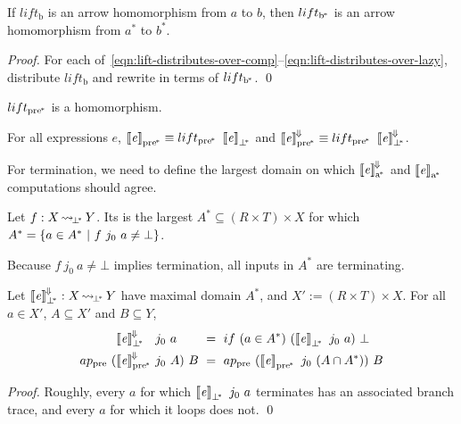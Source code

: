 \documentclass{llncs}
\newcommand{\arrow}{\rightsquigarrow}
\newcommand{\conv}{^{\mspace{-2mu}\Downarrow\mspace{-2mu}}}
\newcommand{\meaningofconv}[1]{\left\llbracket{#1}\right\rrbracket\conv}
\newcommand{\arrowlift}{\ensuremath{lift}}
\newcommand{\genb}{_\mathrm{b}}
\newcommand{\genc}{_\mathrm{a^{\mspace{-2mu}*}}}
\newcommand{\gend}{_\mathrm{b^{\mspace{-2mu}*}}}
\newcommand{\pre}{_\mathrm{pre}}
\newcommand{\pbot}{{\bot^{\mspace{-4mu}*}}}
\DeclareMathOperator{\pbotto}{\arrow_{\mspace{-3mu}\pbot}}
\newcommand{\ppre}{_\mathrm{pre^{\mspace{-2mu}*}}}
\newcommand{\liftppre}{\arrowlift\ppre}
\begin{document}
\begin{theorem}
If $\arrowlift\genb$ is an arrow homomorphism from $a$ to $b$, then $\arrowlift\gend$ is an arrow homomorphism from $a^*$ to $b^*$.
\end{theorem}
\begin{proof}
For each of~\eqref{eqn:lift-distributes-over-comp}--\eqref{eqn:lift-distributes-over-lazy}, distribute $\arrowlift\genb$ and rewrite in terms of $\arrowlift\gend$.
\qed
\end{proof}

\begin{corollary}
$\liftppre$ is a homomorphism.
\end{corollary}

\begin{corollary}
For all expressions $\mathit{e}$, $\meaningof{\mathit{e}}\ppre \equiv \liftppre~\meaningof{\mathit{e}}_\pbot$ and $\meaningofconv{\mathit{e}}\ppre \equiv \liftppre~\meaningofconv{\mathit{e}}_\pbot$.
\end{corollary}

For termination, we need to define the largest domain on which $\meaningofconv{\mathit{e}}\genc$ and $\meaningof{\mathit{e}}\genc$ computations should agree.

\begin{definition}
\label{def:maximal-domain}
Let $f : X \pbotto Y$.
Its  is the largest $A^* \subseteq (R \times T) \times X$ for which $A^* = \lbrace {a \in A^*} \ \lvert\ {f~j_0~a \neq \bot} \rbrace$.
\end{definition}

Because $f~j_0~a \neq \bot$ implies termination, all inputs in $A^*$ are terminating.

\begin{theorem}
\label{thm:correct-convergence}
Let $\meaningofconv{\mathit{e}}_\pbot : X \pbotto Y$ have maximal domain $A^*$, and $X' := (R \times T) \times X$.
For all $a \in X'$, $A \subseteq X'$ and $B \subseteq Y$,
\begin{equation}
\begin{aligned}
	&\meaningofconv{\mathit{e}}_\pbot &&\!\!\!\!j_0~a &&\!\!\!\!= \ if~(a \in A^*)~(\meaningof{\mathit{e}}_\pbot~j_0~a)~\bot \\
	ap\pre~(\!&\meaningofconv{\mathit{e}}\ppre &&\!\!\!\!j_0~A)~B &&\!\!\!\!= \ ap\pre~(\meaningof{\mathit{e}}\ppre~j_0~(A \i A^*))~B
\end{aligned}
\end{equation}
\end{theorem}
\begin{proof}
Roughly, every $a$ for which $\meaningof{\mathit{e}}_\pbot~j_0~a$ terminates has an associated branch trace, and every $a$ for which it loops does not.
\qed
\end{proof}
\end{document}
